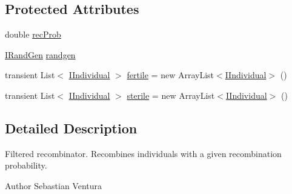 \subsection*{Protected Attributes}
\begin{DoxyCompactItemize}
\item 
double \hyperlink{classnet_1_1sf_1_1jclec_1_1base_1_1_filtered_recombinator_acadc9204c4432d1bb6ff5e8f4a085267}{rec\-Prob}
\item 
\hyperlink{interfacenet_1_1sf_1_1jclec_1_1util_1_1random_1_1_i_rand_gen}{I\-Rand\-Gen} \hyperlink{classnet_1_1sf_1_1jclec_1_1base_1_1_filtered_recombinator_a8799959adcafbfb3928ed5b901925930}{randgen}
\item 
transient List$<$ \hyperlink{interfacenet_1_1sf_1_1jclec_1_1_i_individual}{I\-Individual} $>$ \hyperlink{classnet_1_1sf_1_1jclec_1_1base_1_1_filtered_recombinator_a11a8bd963d9617d71aa5b2cb834940b6}{fertile} = new Array\-List$<$\hyperlink{interfacenet_1_1sf_1_1jclec_1_1_i_individual}{I\-Individual}$>$ ()
\item 
transient List$<$ \hyperlink{interfacenet_1_1sf_1_1jclec_1_1_i_individual}{I\-Individual} $>$ \hyperlink{classnet_1_1sf_1_1jclec_1_1base_1_1_filtered_recombinator_a868d2538743c6926f579f1b7521011fa}{sterile} = new Array\-List$<$\hyperlink{interfacenet_1_1sf_1_1jclec_1_1_i_individual}{I\-Individual}$>$ ()
\end{DoxyCompactItemize}


\subsection{Detailed Description}
Filtered recombinator. Recombines individuals with a given recombination probability.

\begin{DoxyAuthor}{Author}
Sebastian Ventura 
\end{DoxyAuthor}


